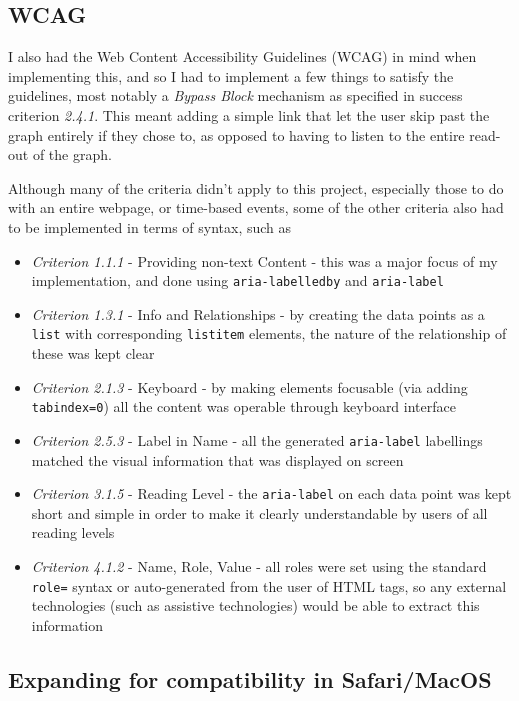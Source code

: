 \documentclass[ %
                    author={Aleena Baig},
                supervisor={Dr Simon Lock},
                    degree={BSc},
                     title={On Making Web Accessible Graphs},
                  subtitle={},
                      year={2019} ]{dissertation}
\begin{document}

\subsection{WCAG}

I also had the Web Content Accessibility Guidelines (WCAG) in mind when implementing this, and so I had to implement a few things to satisfy the guidelines, most notably a \textit{Bypass Block} mechanism as specified in success criterion \textit{2.4.1}. This meant adding a simple link that let the user skip past the graph entirely if they chose to, as opposed to having to listen to the entire read-out of the graph.

Although many of the criteria didn't apply to this project, especially those to do with an entire webpage, or time-based events, some of the other criteria also had to be implemented in terms of syntax, such as

\begin{itemize}
    \item \textit{Criterion 1.1.1} - Providing non-text Content - this was a major focus of my implementation, and done using \texttt{aria-labelledby} and \texttt{aria-label}
    \item \textit{Criterion 1.3.1} - Info and Relationships - by creating the data points as a \texttt{list} with corresponding \texttt{listitem} elements, the nature of the relationship of these was kept clear
    \item \textit{Criterion 2.1.3} - Keyboard - by making elements focusable (via adding \texttt{tabindex=0}) all the content was operable through keyboard interface
    \item \textit{Criterion 2.5.3} - Label in Name - all the generated \texttt{aria-label} labellings matched the visual information that was displayed on screen
    \item \textit{Criterion 3.1.5} - Reading Level - the \texttt{aria-label} on each data point was kept short and simple in order to make it clearly understandable by users of all reading levels
    \item \textit{Criterion 4.1.2} - Name, Role, Value - all roles were set using the standard \texttt{role=} syntax or auto-generated from the user of HTML tags, so any external technologies (such as assistive technologies) would be able to extract this information
\end{itemize}

\subsection{Expanding for compatibility in Safari/MacOS}
\end{document}
